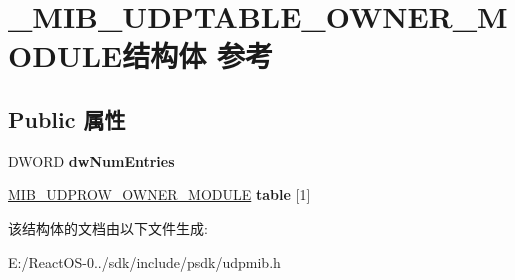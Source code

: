 \hypertarget{struct___m_i_b___u_d_p_t_a_b_l_e___o_w_n_e_r___m_o_d_u_l_e}{}\section{\+\_\+\+M\+I\+B\+\_\+\+U\+D\+P\+T\+A\+B\+L\+E\+\_\+\+O\+W\+N\+E\+R\+\_\+\+M\+O\+D\+U\+L\+E结构体 参考}
\label{struct___m_i_b___u_d_p_t_a_b_l_e___o_w_n_e_r___m_o_d_u_l_e}
\subsection*{Public 属性}
\begin{DoxyCompactItemize}
\item 
\mbox{\label{struct___m_i_b___u_d_p_t_a_b_l_e___o_w_n_e_r___m_o_d_u_l_e_a518f2dc2d7557604b5dad0c0418e0e12}} 
D\+W\+O\+RD {\bfseries dw\+Num\+Entries}
\item 
\mbox{\label{struct___m_i_b___u_d_p_t_a_b_l_e___o_w_n_e_r___m_o_d_u_l_e_abddf7183b48e4e9542655e3226195027}} 
\hyperlink{struct___m_i_b___u_d_p_r_o_w___o_w_n_e_r___m_o_d_u_l_e}{M\+I\+B\+\_\+\+U\+D\+P\+R\+O\+W\+\_\+\+O\+W\+N\+E\+R\+\_\+\+M\+O\+D\+U\+LE} {\bfseries table} \mbox{[}1\mbox{]}
\end{DoxyCompactItemize}


该结构体的文档由以下文件生成\+:\begin{DoxyCompactItemize}
\item 
E\+:/\+React\+O\+S-\/0../sdk/include/psdk/udpmib.\+h\end{DoxyCompactItemize}
